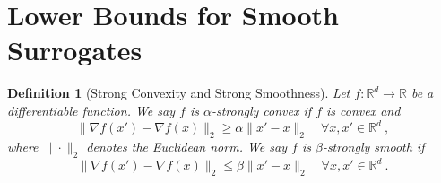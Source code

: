 \documentclass[12pt]{article}
\newcommand{\reals}{\mathbb{R}}
\newtheorem{definition}{Definition}
\begin{document}
\section{Lower Bounds for Smooth Surrogates}

\begin{definition}[Strong Convexity and Strong Smoothness]
  Let $f:\reals^d\to\reals$ be a differentiable function.
  We say $f$ is $\alpha$-\emph{strongly convex} if $f$ is convex and
  \begin{equation}
    \label{eq:strong-convexity}
    \|\nabla f(x') - \nabla f(x)\|_2 \geq \alpha \|x'-x\|_2 \quad \forall x,x'\in\reals^d~,
  \end{equation}
  where $\|\cdot\|_2$ denotes the Euclidean norm.
  We say $f$ is $\beta$-\emph{strongly smooth} if
  \begin{equation}
    \label{eq:strong-convexity}
    \|\nabla f(x') - \nabla f(x)\|_2 \leq \beta \|x'-x\|_2 \quad \forall x,x'\in\reals^d~.
  \end{equation}
  
\end{definition}
\end{document}
